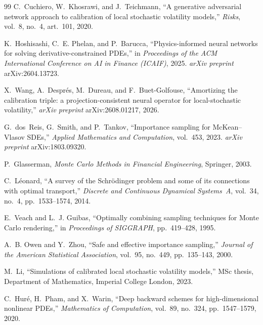 \documentclass[11pt,a4paper]{article}
\theoremstyle{plain}
\theoremstyle{definition}
\theoremstyle{definition}
\begin{document}
\begin{thebibliography}{99}
 C.~Cuchiero, W.~Khosrawi, and J.~Teichmann, ``A generative adversarial network approach to calibration of local stochastic volatility models,'' \textit{Risks}, vol.~8, no.~4, art.~101, 2020.

 K.~Hoshisashi, C.~E. Phelan, and P.~Barucca, ``Physics-informed neural networks for solving derivative-constrained PDEs,'' in \textit{Proceedings of the ACM International Conference on AI in Finance (ICAIF)}, 2025. \textit{arXiv preprint} arXiv:2604.13723.

 X.~Wang, A.~Despr\'es, M.~Dureau, and F.~Buet-Golfouse, ``Amortizing the calibration triple: a projection-consistent neural operator for local-stochastic volatility,'' \textit{arXiv preprint} arXiv:2608.01217, 2026.

 G.~dos~Reis, G.~Smith, and P.~Tankov, ``Importance sampling for McKean--Vlasov SDEs,'' \textit{Applied Mathematics and Computation}, vol.~453, 2023. \textit{arXiv preprint} arXiv:1803.09320.

 P.~Glasserman, \textit{Monte Carlo Methods in Financial Engineering}, Springer, 2003.

 C.~L\'eonard, ``A survey of the {S}chr\"odinger problem and some of its connections with optimal transport,'' \textit{Discrete and Continuous Dynamical Systems~A}, vol.~34, no.~4, pp.~1533--1574, 2014.

 E.~Veach and L.~J. Guibas, ``Optimally combining sampling techniques for {M}onte {C}arlo rendering,'' in \textit{Proceedings of SIGGRAPH}, pp.~419--428, 1995.

 A.~B. Owen and Y.~Zhou, ``Safe and effective importance sampling,'' \textit{Journal of the American Statistical Association}, vol.~95, no.~449, pp.~135--143, 2000.

 M.~Li, ``Simulations of calibrated local stochastic volatility models,'' MSc thesis, Department of Mathematics, Imperial College London, 2023.

 C.~Hur\'e, H.~Pham, and X.~Warin, ``Deep backward schemes for high-dimensional nonlinear PDEs,'' \textit{Mathematics of Computation}, vol.~89, no.~324, pp.~1547--1579, 2020.


\end{thebibliography}
\end{document}
